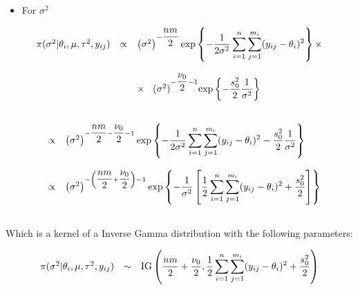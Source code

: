\documentclass[a4paper, 11pt]{article}
\begin{document}
\begin{itemize}
\item For $\sigma^2$
\end{itemize}
\begin{equation*}
\begin{array}{lcl ll }

\pi(\sigma^2|\theta_i, \mu, \tau^2, y_{ij}) & \propto & \left(\sigma^2\right)^{-\dfrac{nm}{2}}\mbox{exp}\left\{ - \dfrac{1}{2\sigma^2}\displaystyle\sum_{i=1}^{n}\displaystyle\sum_{j=1}^{m_i}(y_{ij} - \theta_i)^2\right\} \times \\ \\

& & \times \hspace{0.3cm}(\sigma^2)^{-\dfrac{\nu_0}{2}-1} \mbox{exp}\left\{ - \dfrac{s_0^2}{2}\dfrac{1}{\sigma^2}\right\} \\ \\

 \end{array}
\end{equation*}

\begin{equation*}
\begin{array}{lcl ll }
& \propto & \left(\sigma^2\right)^{-\dfrac{nm}{2}-\dfrac{\nu_0}{2}-1}\mbox{exp}\left\{ - \dfrac{1}{2\sigma^2}\displaystyle\sum_{i=1}^{n}\displaystyle\sum_{j=1}^{m_i}(y_{ij} - \theta_i)^2 - \dfrac{s_0^2}{2}\dfrac{1}{\sigma^2}\right\} \\ \\

& \propto & \left(\sigma^2\right)^{-\left(\dfrac{nm}{2}+\dfrac{\nu_0}{2}\right)-1}\mbox{exp}\left\{ - \dfrac{1}{\sigma^2}\left[\dfrac{1}{2}\displaystyle\sum_{i=1}^{n}\displaystyle\sum_{j=1}^{m_i}(y_{ij} - \theta_i)^2 + \dfrac{s_0^2}{2}\right]\right\} \\ \\
 \end{array}
\end{equation*}

Which is a kernel of a Inverse Gamma distribution with the following parameters:

\begin{equation*}
\begin{array}{lcl ll }

\pi(\sigma^2|\theta_i, \mu, \tau^2, y_{ij}) & \sim &  \mbox{IG} \left( \dfrac{nm}{2}+\dfrac{\nu_0}{2} , \dfrac{1}{2}\displaystyle\sum_{i=1}^{n}\displaystyle\sum_{j=1}^{m_i}(y_{ij} - \theta_i)^2 + \dfrac{s_0^2}{2} \right)  \\\\

 \end{array}
\end{equation*}
\end{document}
